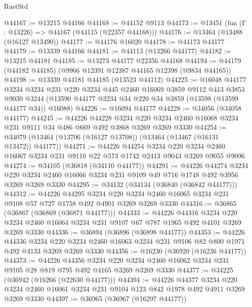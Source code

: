 \begin{lexlean}{RustStd}
\begin{coremodule}
@44167 := @13215 @44166
@44168 := @44152 @9113
@44173 := @13451 (fun (Γ : @13226) => @44167 (@44115 (@22357 @44168)))
@44176 := @13464 (@13488 (@16127 @13490))
@44177 := @44176 @16020
@44178 := @44173 @44177
@44179 := @13339 @44166
@44181 := @44113 (@13266 @44177)
@44182 := @13215 @44181
@44185 := @13273 @44177 @22356 @44168
@44194 := @44179 (@44182 @44185) (@9966 @12391 @12387 @44165 @12398 (@9834 @44165))
@44198 := @13339 @44181 @44185 (@13523 @44112)
@44225 := @16048
    @44177
    @3234
    @3234
    @231
    @220
    @3234
    @445
    @2460
    @16069
    @3859
    @9112
    @413
    @3853
    @9030
    @3244
    (@13590 @44177 @3234 @34 @220 @34 @3859 (@13598 (@13599 @44177 @34)) @16088)
@44226 := @16094 @44177
@44228 := @34056 (@34058 @44177)
@44245 := @44226
    @44228
    @3234
    @220
    @3234
    @2460
    @16068
    @3234
    @231
    @9111
    @34
    @486
    @669
    @492
    @3868
    @3269
    @3269
    @3330
@44254 := @34079 (@13464 (@13706 (@16127 @13708)) (@13464 (@13467 (@16131 @13472)) @44177))
@44271 := @44226
    @44254
    @3234
    @220
    @3234
    @2460
    @16067
    @3234
    @231
    @9110
    @22
    @573
    @1742
    @2413
    @9043
    @3269
    @9055
    @9096
@44274 := @34105 (@36818 (@34110 @44177))
@44291 := @44226
    @44274
    @3234
    @220
    @3234
    @2460
    @16066
    @3234
    @231
    @9109
    @49
    @716
    @1748
    @492
    @3956
    @3269
    @3269
    @3330
@44295 := @34132 (@34134 (@36840 (@36842 @44177)))
@44312 := @44226
    @44295
    @3234
    @220
    @3234
    @2460
    @16065
    @3234
    @231
    @9108
    @57
    @727
    @1758
    @492
    @4901
    @3269
    @3269
    @3330
@44316 := @36865 (@36867 (@36869 (@36871 @44177)))
@44333 := @44226
    @44316
    @3234
    @220
    @3234
    @2460
    @16064
    @3234
    @231
    @9107
    @67
    @787
    @1965
    @492
    @4101
    @3269
    @3269
    @3330
@44336 := @36894 (@36896 (@36898 @44177))
@44353 := @44226
    @44336
    @3234
    @220
    @3234
    @2460
    @16063
    @3234
    @231
    @9106
    @82
    @800
    @1971
    @492
    @4133
    @3269
    @3269
    @3330
@44356 := @16230 (@36920 (@16236 @44177))
@44373 := @44226
    @44356
    @3234
    @220
    @3234
    @2460
    @16062
    @3234
    @231
    @9105
    @28
    @819
    @795
    @492
    @4165
    @3269
    @3269
    @3330
@44377 := @34225 (@36942 (@16266 (@22630 @44177)))
@44394 := @44226
    @44377
    @3234
    @220
    @3234
    @2460
    @16061
    @3234
    @231
    @9104
    @123
    @842
    @1978
    @492
    @4911
    @3269
    @3269
    @3330
@44397 := @36965 (@36967 (@16297 @44177))

\end{coremodule}
\end{lexlean}
